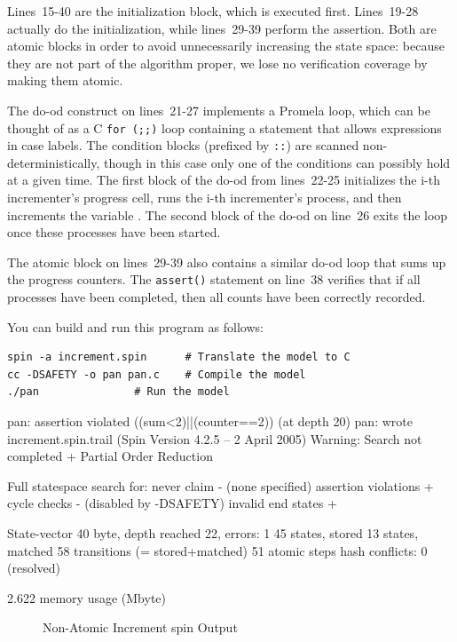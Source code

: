 Lines~15-40 are the initialization block, which is executed first.
Lines~19-28 actually do the initialization, while lines~29-39
perform the assertion.
Both are atomic blocks in order to avoid unnecessarily increasing
the state space: because they are not part of the algorithm proper,
we lose no verification coverage by making them atomic.

The do-od construct on lines~21-27 implements a Promela loop,
which can be thought of as a C {\tt for (;;)} loop containing a
 statement that allows expressions in case labels.
The condition blocks (prefixed by {\tt ::})
are scanned non-deterministically,
though in this case only one of the conditions can possibly hold at a given
time.
The first block of the do-od from lines~22-25 initializes the i-th
incrementer's progress cell, runs the i-th incrementer's process, and
then increments the variable .
The second block of the do-od on line~26 exits the loop once
these processes have been started.

The atomic block on lines~29-39 also contains a similar do-od
loop that sums up the progress counters.
The {\tt assert()} statement on line~38 verifies that if all processes
have been completed, then all counts have been correctly recorded.

You can build and run this program as follows:

\vspace{5pt}
\begin{minipage}[t]{\columnwidth}
\scriptsize
\begin{verbatim}
spin -a increment.spin		# Translate the model to C
cc -DSAFETY -o pan pan.c	# Compile the model
./pan				# Run the model
\end{verbatim}
\end{minipage}
\vspace{5pt}

{ \scriptsize
\begin{verbbox}
pan: assertion violated ((sum<2)||(counter==2)) (at depth 20)
pan: wrote increment.spin.trail
(Spin Version 4.2.5 -- 2 April 2005)
Warning: Search not completed
        + Partial Order Reduction

Full statespace search for:
        never claim             - (none specified)
        assertion violations    +
        cycle checks            - (disabled by -DSAFETY)
        invalid end states      +

State-vector 40 byte, depth reached 22, errors: 1
      45 states, stored
      13 states, matched
      58 transitions (= stored+matched)
      51 atomic steps
hash conflicts: 0 (resolved)

2.622  memory usage (Mbyte)
\end{verbbox}
}
\begin{figure}[tbp]
\centering
\theverbbox
\caption{Non-Atomic Increment spin Output}
\label{fig:analysis:Non-Atomic Increment spin Output}
\end{figure}

